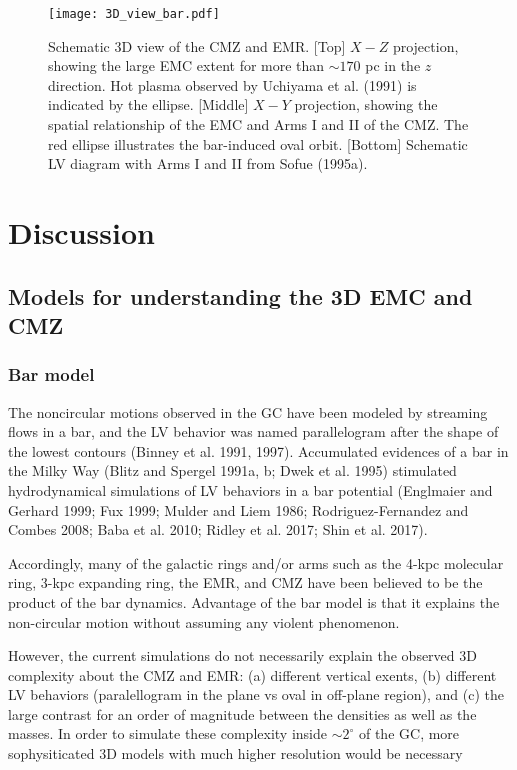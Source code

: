 \documentclass[useAMS,usenatbib]{mn2e}
\def\deg{^\circ}\def\Deg{^\circ}
\begin{document}
\begin{figure} 
\begin{center} 
\texttt{[image: 3D\_view\_bar.pdf]} 
\end{center}
\caption{Schematic 3D view of the CMZ and EMR. [Top] $X-Z$ projection, showing the large EMC extent for more than $\sim 170$ pc in the $z$ direction. Hot plasma observed by Uchiyama et al. (1991) is indicated by the ellipse. [Middle] $X-Y$ projection, showing the spatial relationship of the EMC and Arms I and II of the CMZ. The red ellipse illustrates the bar-induced oval orbit. [Bottom] Schematic LV diagram with Arms I and II from Sofue (1995a).}
 \label{3Dview}  
\end{figure}   
 

\section{Discussion}
 
\subsection{Models for understanding the 3D EMC and CMZ}
 
\subsubsection{Bar model} 
 The noncircular motions observed in the GC have been modeled by streaming flows in a bar, and the LV behavior was named parallelogram after the shape of the lowest contours (Binney et al. 1991, 1997). Accumulated evidences of a bar in the Milky Way (Blitz and Spergel 1991a, b; Dwek et al. 1995) stimulated hydrodynamical simulations of LV behaviors in a bar potential (Englmaier and Gerhard 1999; Fux 1999; Mulder and Liem 1986; Rodriguez-Fernandez and Combes 2008; Baba et al. 2010; Ridley et al. 2017; Shin et al. 2017). 
 
 Accordingly, many of the galactic rings and/or arms such as the 4-kpc molecular ring, 3-kpc expanding ring, the EMR, and CMZ have been believed to be the product of the bar dynamics. Advantage of the bar model is that it explains the non-circular motion without assuming any violent phenomenon. 
 
 
  However, the current simulations do not necessarily explain the observed 3D complexity about the CMZ and EMR: (a) different vertical exents, (b) different LV behaviors (paralellogram in the plane vs oval in off-plane region), and (c) the large contrast for an order of magnitude between the densities as well as the masses. In order to simulate these complexity inside $\sim 2\deg$ of the GC, more sophysiticated 3D models with much higher resolution would be necessary  
 
\end{document}
